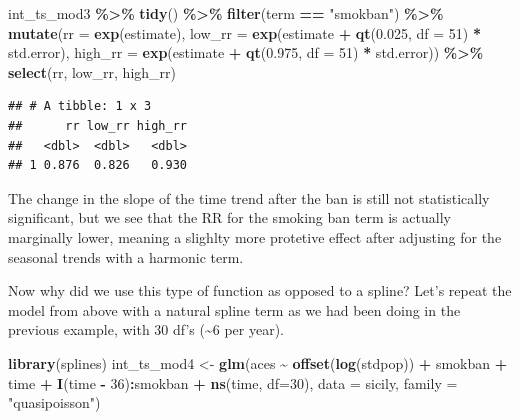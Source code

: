 \documentclass[
]{book}
\newenvironment{Shaded}{\begin{snugshade}}{\end{snugshade}}
\newcommand{\AttributeTok}[1]{\textcolor[rgb]{0.13,0.29,0.53}{#1}}
\newcommand{\DecValTok}[1]{\textcolor[rgb]{0.00,0.00,0.81}{#1}}
\newcommand{\FloatTok}[1]{\textcolor[rgb]{0.00,0.00,0.81}{#1}}
\newcommand{\FunctionTok}[1]{\textcolor[rgb]{0.13,0.29,0.53}{\textbf{#1}}}
\newcommand{\NormalTok}[1]{#1}
\newcommand{\OtherTok}[1]{\textcolor[rgb]{0.56,0.35,0.01}{#1}}
\newcommand{\SpecialCharTok}[1]{\textcolor[rgb]{0.81,0.36,0.00}{\textbf{#1}}}
\newcommand{\StringTok}[1]{\textcolor[rgb]{0.31,0.60,0.02}{#1}}
\begin{document}
\begin{Shaded}
\begin{Highlighting}[]
\NormalTok{int\_ts\_mod3 }\SpecialCharTok{\%\textgreater{}\%} 
  \FunctionTok{tidy}\NormalTok{() }\SpecialCharTok{\%\textgreater{}\%} 
  \FunctionTok{filter}\NormalTok{(term }\SpecialCharTok{==} \StringTok{"smokban"}\NormalTok{) }\SpecialCharTok{\%\textgreater{}\%} 
  \FunctionTok{mutate}\NormalTok{(}\AttributeTok{rr =} \FunctionTok{exp}\NormalTok{(estimate), }
         \AttributeTok{low\_rr =} \FunctionTok{exp}\NormalTok{(estimate }\SpecialCharTok{+} \FunctionTok{qt}\NormalTok{(}\FloatTok{0.025}\NormalTok{, }\AttributeTok{df =} \DecValTok{51}\NormalTok{) }\SpecialCharTok{*}\NormalTok{ std.error), }
         \AttributeTok{high\_rr =} \FunctionTok{exp}\NormalTok{(estimate }\SpecialCharTok{+} \FunctionTok{qt}\NormalTok{(}\FloatTok{0.975}\NormalTok{, }\AttributeTok{df =} \DecValTok{51}\NormalTok{) }\SpecialCharTok{*}\NormalTok{ std.error)) }\SpecialCharTok{\%\textgreater{}\%} 
  \FunctionTok{select}\NormalTok{(rr, low\_rr, high\_rr)}
\end{Highlighting}
\end{Shaded}

\begin{verbatim}
## # A tibble: 1 x 3
##      rr low_rr high_rr
##   <dbl>  <dbl>   <dbl>
## 1 0.876  0.826   0.930
\end{verbatim}

The change in the slope of the time trend after the ban is still not statistically significant, but we see that the RR for the smoking ban term is actually marginally lower, meaning a slighlty more protetive effect after adjusting for the seasonal trends with a harmonic term.

Now why did we use this type of function as opposed to a spline? Let's repeat the model from above with a natural spline term as we had been doing in the previous example, with 30 df's (\textasciitilde6 per year).

\begin{Shaded}
\begin{Highlighting}[]
\FunctionTok{library}\NormalTok{(splines)}
\NormalTok{int\_ts\_mod4 }\OtherTok{\textless{}{-}} \FunctionTok{glm}\NormalTok{(aces }\SpecialCharTok{\textasciitilde{}} \FunctionTok{offset}\NormalTok{(}\FunctionTok{log}\NormalTok{(stdpop)) }\SpecialCharTok{+}\NormalTok{ smokban }\SpecialCharTok{+}\NormalTok{ time }\SpecialCharTok{+} 
                     \FunctionTok{I}\NormalTok{(time }\SpecialCharTok{{-}} \DecValTok{36}\NormalTok{)}\SpecialCharTok{:}\NormalTok{smokban }\SpecialCharTok{+} \FunctionTok{ns}\NormalTok{(time, }\AttributeTok{df=}\DecValTok{30}\NormalTok{), }
                      \AttributeTok{data =}\NormalTok{ sicily, }
                      \AttributeTok{family =} \StringTok{"quasipoisson"}\NormalTok{)}
\end{Highlighting}
\end{Shaded}
\end{document}
